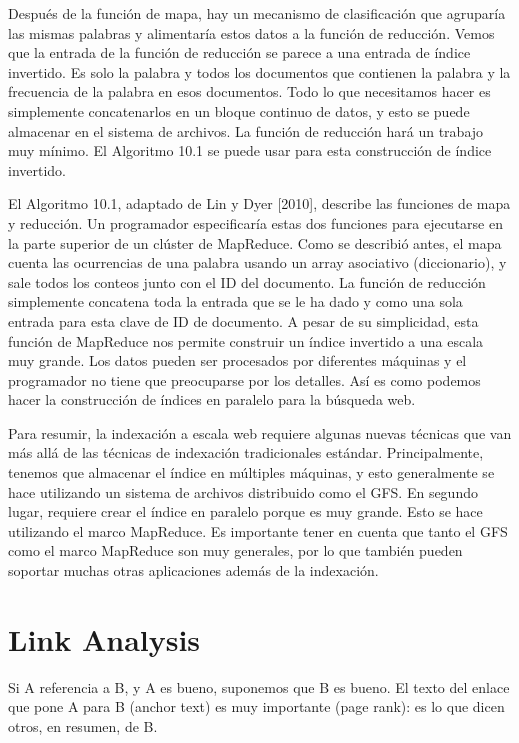 Después de la función de mapa, hay un mecanismo de clasificación que agruparía las mismas palabras y alimentaría estos datos a la función de reducción. Vemos que la entrada de la función de reducción se parece a una entrada de índice invertido. Es solo la palabra y todos los documentos que contienen la palabra y la frecuencia de la palabra en esos documentos. Todo lo que necesitamos hacer es simplemente concatenarlos en un bloque continuo de datos, y esto se puede almacenar en el sistema de archivos. La función de reducción hará un trabajo muy mínimo. El Algoritmo 10.1 se puede usar para esta construcción de índice invertido.

El Algoritmo 10.1, adaptado de Lin y Dyer [2010], describe las funciones de mapa y reducción. Un programador especificaría estas dos funciones para ejecutarse en la parte superior de un clúster de MapReduce. Como se describió antes, el mapa cuenta las ocurrencias de una palabra usando un array asociativo (diccionario), y sale todos los conteos junto con el ID del documento. La función de reducción simplemente concatena toda la entrada que se le ha dado y como una sola entrada para esta clave de ID de documento. A pesar de su simplicidad, esta función de MapReduce nos permite construir un índice invertido a una escala muy grande. Los datos pueden ser procesados por diferentes máquinas y el programador no tiene que preocuparse por los detalles. Así es como podemos hacer la construcción de índices en paralelo para la búsqueda web.

Para resumir, la indexación a escala web requiere algunas nuevas técnicas que van más allá de las técnicas de indexación tradicionales estándar. Principalmente, tenemos que almacenar el índice en múltiples máquinas, y esto generalmente se hace utilizando un sistema de archivos distribuido como el GFS. En segundo lugar, requiere crear el índice en paralelo porque es muy grande. Esto se hace utilizando el marco MapReduce. Es importante tener en cuenta que tanto el GFS como el marco MapReduce son muy generales, por lo que también pueden soportar muchas otras aplicaciones además de la indexación.

\section{Link Analysis}

Si A referencia a B, y A es bueno, suponemos que B es bueno. El texto del enlace que pone A para B (anchor text) es muy importante (page rank): es lo que dicen otros, en resumen, de B. 

